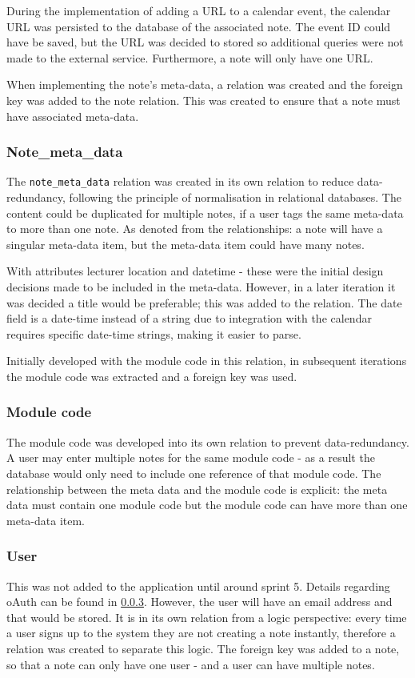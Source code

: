 During the implementation of adding a URL to a calendar event, the calendar URL was persisted to the database of the associated note. The event ID could have be saved, but the URL was decided to stored so additional queries were not made to the external service. Furthermore, a note will only have one URL.

When implementing the note's meta-data, a relation was created and the foreign key was added to the note relation. This was created to ensure that a note must have associated meta-data.

\subsubsection{Note_meta_data}
The \texttt{note_meta_data} relation was created in its own relation to reduce data-redundancy, following the principle of normalisation in relational databases. The content could be duplicated for multiple notes, if a user tags the same meta-data to more than one note. As denoted from the relationships: a note will have a singular meta-data item, but the meta-data item could have many notes.

With attributes lecturer location and datetime - these were the initial design decisions made to be included in the meta-data. However, in a later iteration it was decided a title would be preferable; this was added to the relation. The date field is a date-time instead of a string due to integration with the calendar requires specific date-time strings, making it easier to parse.

Initially developed with the module code in this relation, in subsequent iterations the module code was extracted and a foreign key was used.

\subsubsection{Module code}
The module code was developed into its own relation to prevent data-redundancy. A user may enter multiple notes for the same module code - as a result the database would only need to include one reference of that module code. The relationship between the meta data and the module code is explicit: the meta data must contain one module code but the module code can have more than one meta-data item.

\subsubsection{User}
This was not added to the application until around sprint 5. Details regarding oAuth can be found in \ref{}. However, the user will have an email address and that would be stored. It is in its own relation from a logic perspective: every time a user signs up to the system they are not creating a note instantly, therefore a relation was created to separate this logic. The foreign key was added to a note, so that a note can only have one user - and a user can have multiple notes.


